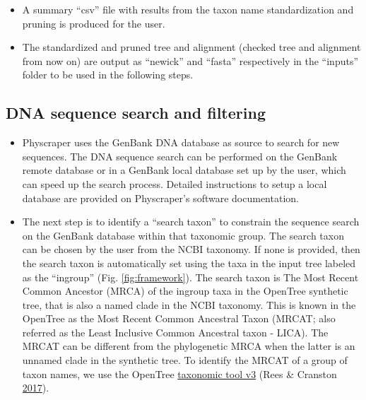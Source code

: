\documentclass[]{article}
\begin{document}
\begin{itemize}
\item
  A summary ``csv'' file with results from the taxon name standardization and pruning is produced for the user.
\item
  The standardized and pruned tree and alignment (checked tree and alignment from now on) are output as ``newick'' and ``fasta'' respectively in the ``inputs'' folder to be used in the following steps.
\end{itemize}

\hypertarget{dna-sequence-search-and-filtering}{%
\subsection{DNA sequence search and filtering}\label{dna-sequence-search-and-filtering}}

\begin{itemize}
\item
  Physcraper uses the GenBank DNA database as source to search for new sequences. The DNA sequence search can be performed on the GenBank remote database or in a GenBank local database set up by the user, which can speed up the search process. Detailed instructions to setup a local database are provided on Physcraper's software documentation.
\item
  The next step is to identify a ``search taxon'' to constrain the sequence search on the GenBank database within that taxonomic group.
  The search taxon can be chosen by the user from the NCBI taxonomy.
  If none is provided, then the search taxon is automatically set using the taxa in the input tree labeled as the ``ingroup'' (Fig. \ref{fig:framework}).
  The search taxon is The Most Recent Common Ancestor (MRCA) of the ingroup taxa in the OpenTree synthetic tree, that is also a named clade in the NCBI taxonomy.
  This is known in the OpenTree as the Most Recent Common
  Ancestral Taxon (MRCAT; also referred as the Least Inclusive Common Ancestral taxon - LICA).
  The MRCAT can be different from the phylogenetic MRCA when the latter is an unnamed clade in the synthetic tree.
  To identify the MRCAT of a group of taxon names, we use the OpenTree \href{https://github.com/OpenTreeOfLife/germinator/wiki/Taxonomy-API-v3\#mrca}{taxonomic tool v3} (Rees \& Cranston \protect\hyperlink{ref-rees2017automated}{2017}).


\end{itemize}
\end{document}
